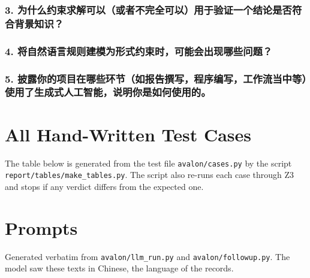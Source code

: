 \documentclass[runningheads]{llncs}
\begin{document}
\subsubsection*{3. 为什么约束求解可以（或者不完全可以）用于验证一个结论是否符合背景知识？}
\vspace{5em}
\subsubsection*{4. 将自然语言规则建模为形式约束时，可能会出现哪些问题？}
\vspace{5em}
\subsubsection*{5. 披露你的项目在哪些环节（如报告撰写，程序编写，工作流当中等）使用了生成式人工智能，说明你是如何使用的。}
\vspace{5em}

\clearpage
\section{All Hand-Written Test Cases}\label{app:cases}
The table below is generated from the test file \texttt{avalon/cases.py} by the script
\texttt{report/tables/make\_tables.py}. The script also re-runs each case through Z3 and stops if any verdict
differs from the expected one.


\section{Prompts}\label{app:prompts}
Generated verbatim from \texttt{avalon/llm\_run.py} and \texttt{avalon/followup.py}. The model saw these texts in
Chinese, the language of the records.


\end{document}
